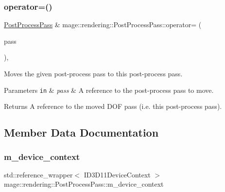 \subsubsection{\texorpdfstring{operator=()}{operator=()}\hspace{0.1cm}{\footnotesize\ttfamily [2/2]}}
{\footnotesize\ttfamily \mbox{\hyperlink{classmage_1_1rendering_1_1_post_process_pass}{Post\+Process\+Pass}} \& mage\+::rendering\+::\+Post\+Process\+Pass\+::operator= (\begin{DoxyParamCaption}\item[{\mbox{\hyperlink{classmage_1_1rendering_1_1_post_process_pass}{Post\+Process\+Pass}} \&\&}]{pass }\end{DoxyParamCaption})\hspace{0.3cm}{\ttfamily [default]}, {\ttfamily [noexcept]}}

Moves the given post-\/process pass to this post-\/process pass.


\begin{DoxyParams}[1]{Parameters}
\mbox{\tt in}  & {\em pass} & A reference to the post-\/process pass to move. \\
\hline
\end{DoxyParams}
\begin{DoxyReturn}{Returns}
A reference to the moved D\+OF pass (i.\+e. this post-\/process pass). 
\end{DoxyReturn}


\subsection{Member Data Documentation}
\mbox{\label{classmage_1_1rendering_1_1_post_process_pass_a18468bc4ffa408e9db3089b306f45291}} 
\subsubsection{\texorpdfstring{m\+\_\+device\+\_\+context}{m\_device\_context}}
{\footnotesize\ttfamily std\+::reference\+\_\+wrapper$<$ I\+D3\+D11\+Device\+Context $>$ mage\+::rendering\+::\+Post\+Process\+Pass\+::m\+\_\+device\+\_\+context\hspace{0.3cm}{\ttfamily [private]}}

